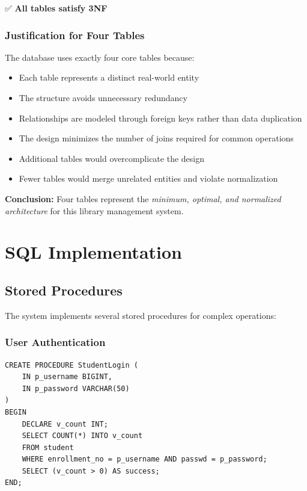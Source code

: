 \documentclass[12pt,a4paper]{article}
\begin{document}
✅ \textbf{All tables satisfy 3NF}



\subsubsection{Justification for Four Tables}

The database uses exactly four core tables because:
\begin{itemize}
    \item Each table represents a distinct real-world entity
    \item The structure avoids unnecessary redundancy
    \item Relationships are modeled through foreign keys rather than data duplication
    \item The design minimizes the number of joins required for common operations
    \item Additional tables would overcomplicate the design
    \item Fewer tables would merge unrelated entities and violate normalization
\end{itemize}

\textbf{Conclusion:} Four tables represent the \textit{minimum, optimal, and normalized architecture} for this library management system.

\section{SQL Implementation}

\subsection{Stored Procedures}

The system implements several stored procedures for complex operations:

\subsubsection{User Authentication}

\begin{lstlisting}[caption=Student Login Procedure]
CREATE PROCEDURE StudentLogin (
    IN p_username BIGINT,
    IN p_password VARCHAR(50)
)
BEGIN
    DECLARE v_count INT;
    SELECT COUNT(*) INTO v_count
    FROM student
    WHERE enrollment_no = p_username AND passwd = p_password;
    SELECT (v_count > 0) AS success;
END;
\end{lstlisting}
\end{document}
